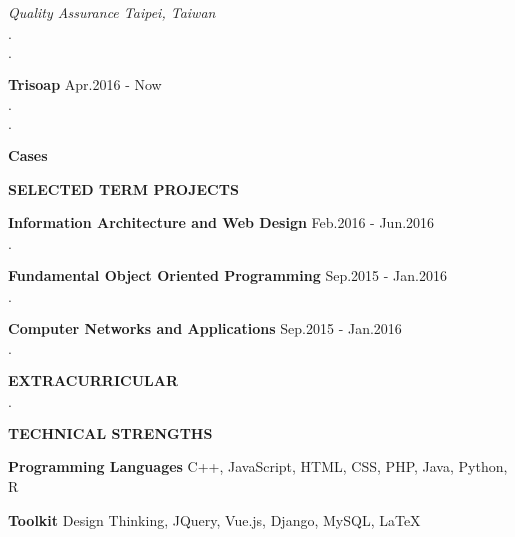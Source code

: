 \documentclass[12pt]{article}
\begin{document}
\textit{Quality Assurance \hfill{Taipei, Taiwan}}

$\cdot$

$\cdot$

\textbf{Trisoap} \hfill{Apr.2016 - Now}

$\cdot$

$\cdot$

\textbf{Cases}

\vspace{0.5em}

\textbf{\large{\uppercase{Selected Term Projects}}}
\hrulefill{}

\textbf{Information Architecture and Web Design} \hfill{Feb.2016 - Jun.2016}

$\cdot$

\textbf{Fundamental Object Oriented Programming} \hfill{Sep.2015 - Jan.2016}

$\cdot$

\textbf{Computer Networks and Applications} \hfill{Sep.2015 - Jan.2016}

$\cdot$

\vspace{0.5em}

\textbf{\large{\uppercase{Extracurricular}}}
\hrulefill{}

\textbf{}

$\cdot$

\vspace{0.5em}

\textbf{\large{\uppercase{Technical Strengths}}}
\hrulefill{}

\textbf{Programming Languages} \hfill{C++, JavaScript, HTML, CSS, PHP, Java, Python, R}

\textbf{Toolkit} \hfill{Design Thinking, JQuery, Vue.js, Django, MySQL, LaTeX}
\end{document}
